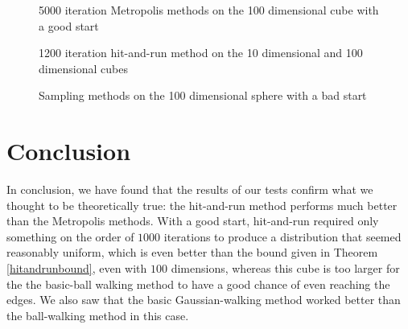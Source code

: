 \documentclass[11pt]{article}
\begin{document}
\begin{figure}
\centering
{}
\caption{5000 iteration Metropolis methods on the 100 dimensional cube with a good start}
\label{big_cube}
\end{figure}

\begin{figure}
\centering
{}
\caption{1200 iteration hit-and-run method on the 10 dimensional and 100 dimensional cubes}
\label{hitandrun}
\end{figure}

\begin{figure}
\centering
{}


\caption{Sampling methods on the 100 dimensional sphere with a bad start}
\label{sphere}
\end{figure}

\section{Conclusion}

In conclusion, we have found that the results of our tests confirm what we thought to be theoretically true: the hit-and-run method performs much better than the Metropolis methods. With a good start, hit-and-run required only something on the order of $1000$ iterations to produce a distribution that seemed reasonably uniform, which is even better than the bound given in Theorem \ref{hitandrunbound}, even with $100$ dimensions, whereas this cube is too larger for the the basic-ball walking method to have a good chance of even reaching the edges. We also saw that the basic Gaussian-walking method worked better than the ball-walking method in this case.
\end{document}
